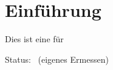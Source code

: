 \documentclass[12pt,a4paper,ngerman,numbers=noenddot,toc=listof]{scrartcl}	%
\begin{document}
\thispagestyle{empty}

\newpage{}
\tableofcontents	%

\setcounter{headpages}{\value{page}}\newpage{}
\section{Einführung}
\label{sec:einleitung}
Dies ist eine \TITEL für \SUBJECT{}

\setcounter{sectionsV}{\value{section}}		%
\appendix	%

\vfill
\printURLlong
\printlicense
\printendsignature
  \newpage\Statistiken
  Status:~ (eigenes Ermessen)
  \newpage
  \begin{sourcefiletable}{1}
  \end{sourcefiletable}
%	
\end{document}
